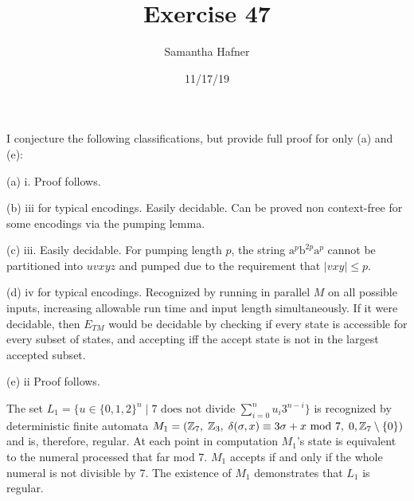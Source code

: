 \documentclass[12pt]{article}
\title{Exercise 47}
\author{Samantha Hafner}
\date{11/17/19}
\begin{document}
\maketitle

I conjecture the following classifications, but provide full proof for only (a) and (e):

(a) i. Proof follows.

(b) iii for typical encodings. Easily decidable. Can be proved non context-free for some encodings via the pumping lemma.

(c) iii. Easily decidable. For pumping length $p$, the string $\textrm{a}^p\textrm{b}^{2p}\textrm{a}^p$ cannot be partitioned into $uvxyz$ and pumped due to the requirement that $|vxy|\le p$.

(d) iv for typical encodings. Recognized by running in parallel $M$ on all possible inputs, increasing allowable run time and input length simultaneously. If it were decidable, then $E_{TM}$ would be decidable by checking if every state is accessible for every subset of states, and accepting iff the accept state is not in the largest accepted subset.

(e) ii Proof follows.


\bigskip

The set $L_1 = \{u\in\{0,1,2\}^n\;|\;7\textrm{ does not divide }\sum_{i=0}^nu_i3^{n-i}\}$ is recognized by deterministic finite automata $M_1 = (\mathbb{Z}_7,\; \mathbb{Z}_3,\; \delta(\sigma, x) \equiv 3\sigma+x \textrm{ mod } 7,\; 0,\\\mathbb{Z}_7\setminus\{0\})$ and is, therefore, regular. At each point in computation $M_1$'s state is equivalent to the numeral processed that far mod 7. $M_1$ accepts if and only if the whole numeral is not divisible by 7. The existence of $M_1$ demonstrates that $L_1$ is regular.

\bigskip
\end{document}
